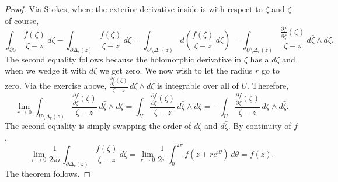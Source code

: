 \documentclass[12pt,openany]{book}
\theoremstyle{plain}
\theoremstyle{remark}
\theoremstyle{definition}
\theoremstyle{exercise}
\theoremstyle{example}
\begin{document}
\begin{proof}
Via Stokes, where the exterior derivative inside is with respect to $\zeta$
and $\bar{\zeta}$ of
course,
\begin{equation*}
\int_{\partial U} \frac{f(\zeta)}{\zeta-z}\,  d\zeta -
\int_{\partial \Delta_r(z)} \frac{f(\zeta)}{\zeta-z}\,  d\zeta
=
\int_{U \setminus \Delta_r(z)} d\left( \frac{f(\zeta)}{\zeta-z} \, d\zeta \right)
=
\int_{U \setminus \Delta_r(z)} \frac{\frac{\partial f}{\partial
\bar{\zeta}}(\zeta)}{\zeta-z} \, d\bar{\zeta} \wedge d\zeta .
\end{equation*}
The second equality follows because the holomorphic derivative in $\zeta$
has a $d\zeta$ and when we wedge it with $d\zeta$ we get zero.
We now wish to let the radius $r$ go to zero.
Via the exercise above,
$\frac{\frac{\partial f}{\partial \bar{\zeta}}(\zeta)}{\zeta-z} \, d\bar{\zeta} \wedge d\zeta$
is integrable over all of $U$.  Therefore,
\begin{equation*}
\lim_{r \to 0}
\int_{U \setminus \Delta_r(z)} \frac{\frac{\partial f}{\partial
\bar{\zeta}}(\zeta)}{\zeta-z} \, d\bar{\zeta} \wedge d\zeta
=
\int_{U} \frac{\frac{\partial f}{\partial
\bar{\zeta}}(\zeta)}{\zeta-z} \, d\bar{\zeta} \wedge d\zeta
=
-
\int_{U} \frac{\frac{\partial f}{\partial
\bar{\zeta}}(\zeta)}{\zeta-z} \, d\zeta \wedge d\bar{\zeta} .
\end{equation*}
The second equality is simply swapping the order of $d\zeta$ and
$d\bar{\zeta}$.
By continuity of $f$,
\begin{equation*}
\lim_{r \to 0}
\frac{1}{2\pi i}
\int_{\partial \Delta_r(z)} \frac{f(\zeta)}{\zeta-z}\,  d\zeta
=
\lim_{r \to 0}
\frac{1}{2\pi}
\int_0^{2\pi} f(z + r e^{i\theta})\, d\theta
=
f(z) .
\end{equation*}
The theorem follows.
\end{proof}
\end{document}
